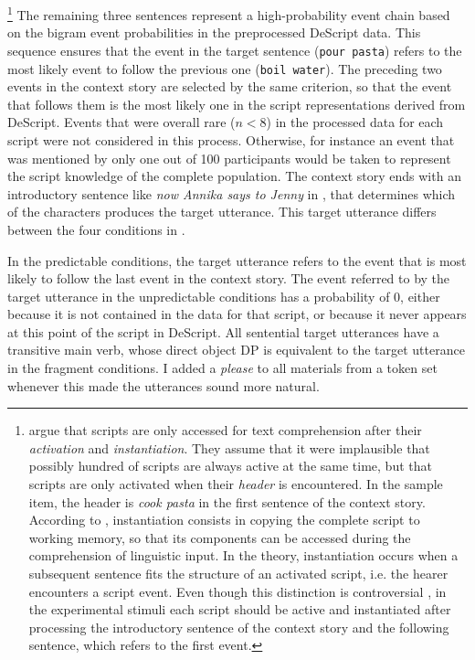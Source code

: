 \footnote{\citet{schank.abelson1977} argue that scripts are only accessed for text comprehension after their \textit{activation} and \textit{instantiation}. They assume that it were implausible that possibly hundred of scripts are always active at the same time, but that scripts are only activated when their \textit{header} is encountered. In the sample item, the header is \textit{cook pasta} in the first sentence of the context story. According to \citet[47--48]{schank.abelson1977}, instantiation consists in copying the complete script to working memory, so that its components can be accessed during the comprehension of linguistic input. In the theory, instantiation occurs when a subsequent sentence fits the structure of an activated script, i.e. the hearer encounters a script event. Even though this distinction is controversial \citep[see e.g.][]{rabs.etal2017}, in the experimental stimuli each script should be active and instantiated after processing the introductory sentence of the context story and the following sentence, which refers to the first event.}\afterfn%
%
The remaining three sentences represent a high-probability event chain based on the bigram event probabilities in the preprocessed DeScript data. This sequence ensures that the event in the target sentence \Last[a] (\texttt{pour pasta}) refers to the most likely event to follow the previous one (\texttt{boil water}). The preceding two events in the context story are selected by the same criterion, so that the event that follows them is the most likely one in the script representations derived from DeScript. Events that were overall rare ($n < 8$) in the processed data for each script were not considered in this process. Otherwise, for instance an event that was mentioned by only one out of 100 participants would be taken to represent the script knowledge of the complete population. The context story ends with an introductory sentence like \textit{now Annika says to Jenny} in \Last, that determines which of the characters produces the target utterance. This target utterance differs between the four conditions in \Last[a-d].

In the predictable conditions, the target utterance refers to the event that is most likely to follow the last event in the context story. The event referred to by the target utterance in the unpredictable conditions has a probability of 0, either because it is not contained in the data for that script, or because it never appears at this point of the script in DeScript. All sentential target utterances have a transitive main verb, whose direct object DP is equivalent to the target utterance in the fragment conditions. I added a \textit{please} to all materials from a token set whenever this made the utterances sound more natural.

